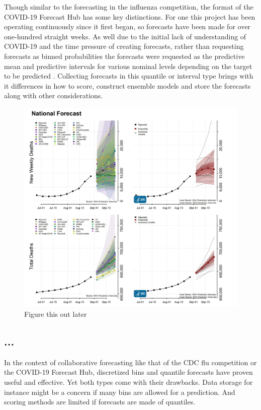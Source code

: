 \documentclass{article}\usepackage[]{graphicx}\usepackage[]{color}
\begin{document}
Though similar to the forecasting in the influenza competition, the format of 
the COVID-19 Forecast Hub has some key distinctions. For one this project has
been operating continuously since it first began, so forecasts have been made
for over one-hundred straight weeks. 
As well due to the initial lack of understanding of COVID-19 and the time 
pressure of
creating forecasts, rather than requesting forecasts as binned probabilities
the forecasts were requested as the predictive mean and 
predictive intervals for various nominal levels depending on the target to be
predicted \cite{bracher2021evaluating}. Collecting forecasts in this quantile
or interval type brings with it differences in how to score, construct ensemble
models and store the forecasts along with other considerations.

\begin{figure}[htbp]
\centerline{\includegraphics[scale=.12]{8_30_21_cvd_deaths.jpeg}}
\caption{Figure this out later}
\label{fig}
\end{figure}

\subsection{...}
In the context of collaborative forecasting like that of the CDC flu competition
or the COVID-19 Forecast Hub, discretized bins and quantile forecasts have 
proven useful and effective. Yet both types come with their drawbacks. Data 
storage for instance might be a concern if many bins are allowed for a 
prediction. And scoring methods are limited if forecasts are made of quantiles.
\end{document}
